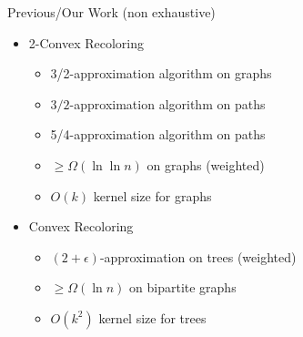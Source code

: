 \begin{frame}{Previous/\alert{Our} Work (non exhaustive)}
\begin{itemize}
\item
2-Convex Recoloring
\begin{itemize}


\item<7->
\alert{3/2-approximation algorithm on graphs}

\item<2->
$3/2$-approximation algorithm on paths

\item<8->
\alert{5/4-approximation algorithm on paths}

\item<3->
$\geq \Omega(\ln\ln{n})$ on graphs (weighted)

\item<9->
\alert{$O(k)$ kernel size for graphs}


\end{itemize}
\item
Convex Recoloring
\begin{itemize}


\item<4->
$(2 + \epsilon)$-approximation on trees (weighted)

\item<5->
$\geq \Omega(\ln{n})$ on bipartite graphs

\item<6->
$O(k^2)$ kernel size for trees


\end{itemize}
\end{itemize}
\end{frame}
